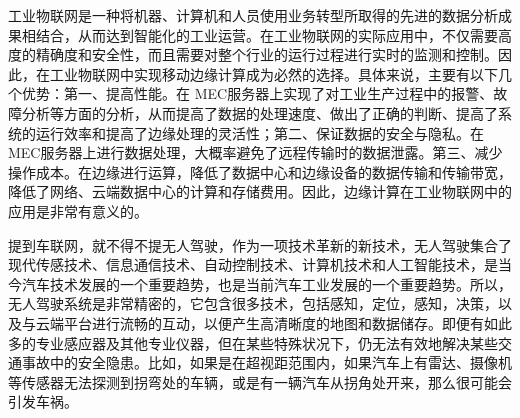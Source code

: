 \documentclass[UTF8,12pt,twoside,a4paper]{ctexart} %
\begin{document}
\clearpage{\pagestyle{empty}}%

\begin{center}
\end{center}
\vspace*{10pt}
\begin{flushleft}
\end{flushleft}
\indent\setlength{\parindent}{2em}%
\songti
\hspace{1.6em}%
工业物联网是一种将机器、计算机和人员使用业务转型所取得的先进的数据分析成果相结合，从而达到智能化的工业运营。在工业物联网的实际应用中，不仅需要高度的精确度和安全性，而且需要对整个行业的运行过程进行实时的监测和控制。因此，在工业物联网中实现移动边缘计算成为必然的选择。具体来说，主要有以下几个优势：第一、提高性能。在 MEC服务器上实现了对工业生产过程中的报警、故障分析等方面的分析，从而提高了数据的处理速度、做出了正确的判断、提高了系统的运行效率和提高了边缘处理的灵活性；第二、保证数据的安全与隐私。在 MEC服务器上进行数据处理，大概率避免了远程传输时的数据泄露。第三、减少操作成本。在边缘进行运算，降低了数据中心和边缘设备的数据传输和传输带宽，降低了网络、云端数据中心的计算和存储费用。因此，边缘计算在工业物联网中的应用是非常有意义的。
\vspace{10pt}

\begin{flushleft}
\end{flushleft}
\indent\setlength{\parindent}{2em}%
\songti
\hspace{1.6em}%
提到车联网，就不得不提无人驾驶，作为一项技术革新的新技术，无人驾驶集合了现代传感技术、信息通信技术、自动控制技术、计算机技术和人工智能技术，是当今汽车技术发展的一个重要趋势，也是当前汽车工业发展的一个重要趋势。所以，无人驾驶系统是非常精密的，它包含很多技术，包括感知，定位，感知，决策，以及与云端平台进行流畅的互动，以便产生高清晰度的地图和数据储存。即便有如此多的专业感应器及其他专业仪器，但在某些特殊状况下，仍无法有效地解决某些交通事故中的安全隐患。比如，如果是在超视距范围内，如果汽车上有雷达、摄像机等传感器无法探测到拐弯处的车辆，或是有一辆汽车从拐角处开来，那么很可能会引发车祸。
\end{document}

